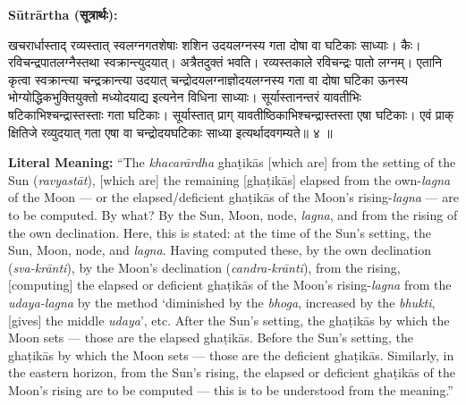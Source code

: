 \documentclass[11pt,a4paper]{article}
\newcommand{\dev}[1]{{\devanagarifont #1}}
\newenvironment{sanskritverse}{%
  \begin{center}\begin{minipage}{0.95\textwidth}
  \setlength{\leftskip}{1em}
  \setlength{\rightskip}{1em}
  \dev
}{\end{minipage}\end{center}}
\newenvironment{paracol}[1]{\begingroup}{\endgroup}
\newcommand{\switchcolumn}[1][]{%
  \ifnum#1=0\relax\else\par\nobreak\vspace{0.5em}\par\nobreak\fi%
}
\begin{document}
\begin{paracol}{2}

\noindent\textbf{Sūtrārtha (\dev{सूत्रार्थः}):}
\begin{sanskritverse}
खचरार्धास्ताद् रव्यस्तात् स्वलग्नगतशेषाः शशिन उदयलग्नस्य गता दोषा वा
घटिकाः साध्याः। कैः। रविचन्द्रपातलग्नैस्तथा स्वक्रान्त्युदयात्। अत्रैतदुक्तं भवति।
रव्यस्तकाले रविचन्द्रः पातो लग्नम्। एतानि कृत्वा स्वक्रान्त्या चन्द्रक्रान्त्या
उदयात् चन्द्रोदयलग्नाज्ञोदयलग्नस्य गता वा दोषा घटिका ऊनस्य भोग्योद्धिकभुक्तियुक्तो
मध्योदयाद्य इत्यनेन विधिना साध्याः। सूर्यास्तानन्तरं यावतीभिः षटिकाभिश्चन्द्रास्तस्ताः
गता घटिकाः। सूर्यास्तात् प्राग् यावतीष्ठिकाभिश्चन्द्रास्तस्ता एषा घटिकाः। एवं प्राक्
क्षितिजे रव्युदयात् गता एषा वा चन्द्रोदयघटिकाः साध्या इत्यर्थादवगम्यते॥ ४ ॥
\end{sanskritverse}

\switchcolumn

\textbf{Literal Meaning:} ``The \textit{khacarārdha} ghaṭikās [which are] from the setting of the Sun (\textit{ravyastāt}), [which are] the remaining [ghaṭikās] elapsed from the own-\textit{lagna} of the Moon --- or the elapsed/deficient ghaṭikās of the Moon's rising-\textit{lagna} --- are to be computed. By what? By the Sun, Moon, node, \textit{lagna}, and from the rising of the own declination. Here, this is stated: at the time of the Sun's setting, the Sun, Moon, node, and \textit{lagna}. Having computed these, by the own declination (\textit{sva-krānti}), by the Moon's declination (\textit{candra-krānti}), from the rising, [computing] the elapsed or deficient ghaṭikās of the Moon's rising-\textit{lagna} from the \textit{udaya-lagna} by the method `diminished by the \textit{bhoga}, increased by the \textit{bhukti}, [gives] the middle \textit{udaya}', etc. After the Sun's setting, the ghaṭikās by which the Moon sets --- those are the elapsed ghaṭikās. Before the Sun's setting, the ghaṭikās by which the Moon sets --- those are the deficient ghaṭikās. Similarly, in the eastern horizon, from the Sun's rising, the elapsed or deficient ghaṭikās of the Moon's rising are to be computed --- this is to be understood from the meaning.''

\end{paracol}

\vspace{0.5em}
\end{document}
